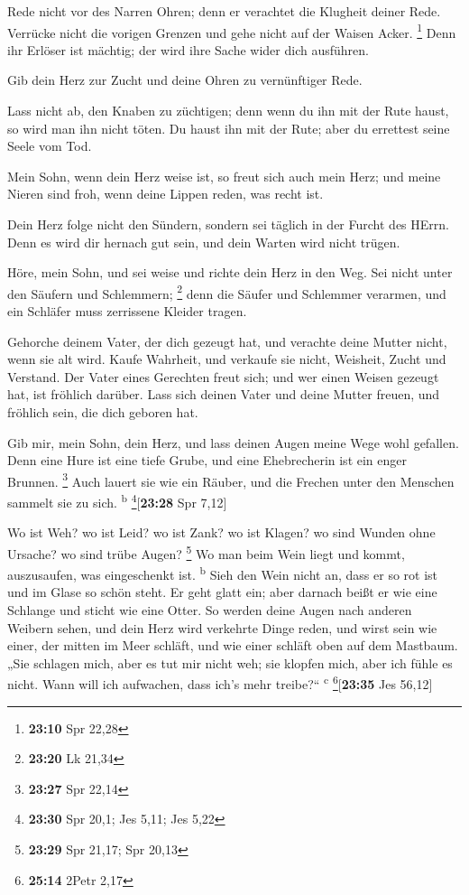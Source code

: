  Rede nicht vor des Narren Ohren; denn er verachtet die
Klugheit deiner Rede.  Verrücke nicht die vorigen Grenzen
und gehe nicht auf der Waisen Acker. \footnote{\textbf{23:10} Spr 22,28}
 Denn ihr Erlöser ist mächtig; der wird ihre Sache wider
dich ausführen.

 Gib dein Herz zur Zucht und deine Ohren zu vernünftiger
Rede.

 Lass nicht ab, den Knaben zu züchtigen; denn wenn du ihn
mit der Rute haust, so wird man ihn nicht töten.  Du
haust ihn mit der Rute; aber du errettest seine Seele vom Tod.

 Mein Sohn, wenn dein Herz weise ist, so freut sich auch
mein Herz;  und meine Nieren sind froh, wenn deine Lippen
reden, was recht ist.

 Dein Herz folge nicht den Sündern, sondern sei täglich
in der Furcht des HErrn.  Denn es wird dir hernach gut
sein, und dein Warten wird nicht trügen.

 Höre, mein Sohn, und sei weise und richte dein Herz in
den Weg.  Sei nicht unter den Säufern und Schlemmern;
\footnote{\textbf{23:20} Lk 21,34}  denn die Säufer und
Schlemmer verarmen, und ein Schläfer muss zerrissene Kleider tragen.

 Gehorche deinem Vater, der dich gezeugt hat, und
verachte deine Mutter nicht, wenn sie alt wird.  Kaufe
Wahrheit, und verkaufe sie nicht, Weisheit, Zucht und Verstand.
 Der Vater eines Gerechten freut sich; und wer einen
Weisen gezeugt hat, ist fröhlich darüber.  Lass sich
deinen Vater und deine Mutter freuen, und fröhlich sein, die dich
geboren hat.

 Gib mir, mein Sohn, dein Herz, und lass deinen Augen
meine Wege wohl gefallen.  Denn eine Hure ist eine tiefe
Grube, und eine Ehebrecherin ist ein enger Brunnen. \footnote{\textbf{23:27}
  Spr 22,14}  Auch lauert sie wie ein Räuber, und die
Frechen unter den Menschen sammelt sie zu sich. \textsuperscript{b}
\footnote{\textbf{23:30} Spr 20,1; Jes 5,11; Jes 5,22}{[}\textbf{23:28}
Spr 7,12{]}

 Wo ist Weh? wo ist Leid? wo ist Zank? wo ist Klagen? wo
sind Wunden ohne Ursache? wo sind trübe Augen? \footnote{\textbf{23:29}
  Spr 21,17; Spr 20,13}  Wo man beim Wein liegt und
kommt, auszusaufen, was eingeschenkt ist. \textsuperscript{b}
 Sieh den Wein nicht an, dass er so rot ist und im Glase
so schön steht. Er geht glatt ein;  aber darnach beißt er
wie eine Schlange und sticht wie eine Otter.  So werden
deine Augen nach anderen Weibern sehen, und dein Herz wird verkehrte
Dinge reden,  und wirst sein wie einer, der mitten im
Meer schläft, und wie einer schläft oben auf dem Mastbaum.
 „Sie schlagen mich, aber es tut mir nicht weh; sie
klopfen mich, aber ich fühle es nicht. Wann will ich aufwachen, dass
ich's mehr treibe?{}`` \textsuperscript{c} \footnote{\textbf{25:14}
  2Petr 2,17}{[}\textbf{23:35} Jes 56,12{]}

